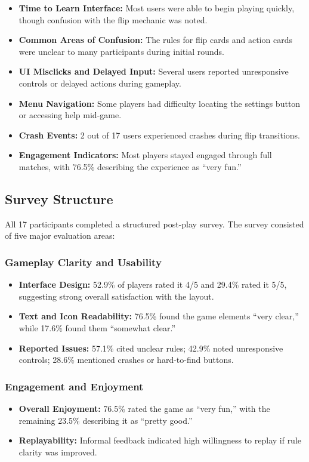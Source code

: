 \documentclass[12pt, titlepage]{article}
\begin{document}
\begin{itemize}
    \item \textbf{Time to Learn Interface:} Most users were able to begin playing quickly, though confusion with the flip mechanic was noted.
    \item \textbf{Common Areas of Confusion:} The rules for flip cards and action cards were unclear to many participants during initial rounds.
    \item \textbf{UI Misclicks and Delayed Input:} Several users reported unresponsive controls or delayed actions during gameplay.
    \item \textbf{Menu Navigation:} Some players had difficulty locating the settings button or accessing help mid-game.
    \item \textbf{Crash Events:} 2 out of 17 users experienced crashes during flip transitions.
    \item \textbf{Engagement Indicators:} Most players stayed engaged through full matches, with 76.5\% describing the experience as “very fun.”
\end{itemize}

\subsection{Survey Structure}
All 17 participants completed a structured post-play survey. The survey consisted of five major evaluation areas:

\subsubsection{Gameplay Clarity and Usability}
\begin{itemize}
    \item \textbf{Interface Design:} 52.9\% of players rated it 4/5 and 29.4\% rated it 5/5, suggesting strong overall satisfaction with the layout.
    \item \textbf{Text and Icon Readability:} 76.5\% found the game elements “very clear,” while 17.6\% found them “somewhat clear.”
    \item \textbf{Reported Issues:} 57.1\% cited unclear rules; 42.9\% noted unresponsive controls; 28.6\% mentioned crashes or hard-to-find buttons.
\end{itemize}

\subsubsection{Engagement and Enjoyment}
\begin{itemize}
    \item \textbf{Overall Enjoyment:} 76.5\% rated the game as “very fun,” with the remaining 23.5\% describing it as “pretty good.”
    \item \textbf{Replayability:} Informal feedback indicated high willingness to replay if rule clarity was improved.
\end{itemize}
\end{document}
